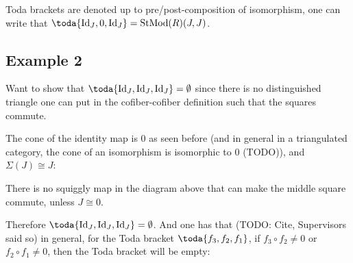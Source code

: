 Toda brackets are denoted up to pre/post-composition of isomorphism, one can write that \( \toda{\Id_J, 0, \Id_J} = \StMod(R)(J, J) \).

\subsection{Example 2}

Want to show that \( \toda{\Id_J, \Id_J, \Id_J} = \emptyset \) since there is no distinguished triangle one can put in the cofiber-cofiber definition such that the squares commute.

The cone of the identity map is \( 0 \) as seen before (and in general in a triangulated category, the cone of an isomorphism is isomorphic to \( 0 \) (TODO)), and \( \Sigma(J) \cong J \):

\begin{center}
\end{center}

There is no squiggly map in the diagram above that can make the middle square commute, unless \( J \cong 0 \).

Therefore \( \toda{\Id_J, \Id_J, \Id_J} = \emptyset \). And one has that (TODO: Cite, Supervisors said so) in general, for the Toda bracket \( \toda{f_3, f_2, f_1} \), if \( f_3 \circ f_2 \neq 0 \) or \( f_2 \circ f_1 \neq 0 \), then the Toda bracket will be empty:

